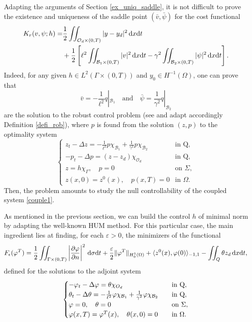 \documentclass{dcds-bOF}
\theoremstyle{definition}
\def\cbd{\Gamma}
\newcommand\csin[1]{\chi_{#1}}
\def\dx{\,\textnormal{d}x}
\def\dt{\textnormal{d}t}
\def\d{\,\textnormal{d}}
\begin{document}
Adapting the arguments of Section \ref{ex_uniq_saddle}, it is not difficult to prove the existence and uniqueness of the saddle point $(\bar v,\bar \psi)$ for the cost functional
%
\begin{equation*}%
\begin{split}
K_r(v,\psi;h)=&\frac{1}{2}\iint_{\mathcal O_d\times(0,T)}|y-y_d|^2\dx\dt\\
&+\frac{1}{2}\left[\ell^2\iint_{\mathcal B_1\times(0,T)}|v|^2\dx\dt-\gamma^2\iint_{\mathcal B_2\times(0,T)}|\psi|^2\dx\dt\right].
\end{split}
\end{equation*}
%
Indeed, for any given $h\in L^2(\cbd\times(0,T))$ and $y_0\in H^{-1}(\Omega)$, one can prove that
%
\begin{equation*}
\bar v=-\frac{1}{\ell^2}q|_{\mathcal B_1} \quad\text{and}\quad \bar \psi=\frac{1}{\gamma^2}q|_{\mathcal B_2}
\end{equation*}
%
are the solution to the robust control problem (see and adapt accordingly Definition \ref{defi_rob}), where $p$ is found from the solution $(z,p)$ to the optimality system
\begin{equation}\label{couple1}
\begin{cases}
z_t-\Delta z=-\frac{1}{\ell^2}p\csin{\mathcal B_1}+\frac{1}{\gamma^2}p\csin{\mathcal B_2} & \text{in Q}, \\
-p_t-\Delta p=(z-z_d)\chi_{\mathcal O_d} & \text{in Q}, \\
z=h\csin{\Gamma}, \quad p=0 &\text{on } \Sigma, \\
z(x,0)=z^0(x), \quad p(x,T)=0& \text{in } \Omega.
\end{cases}
\end{equation}
%
Then, the problem amounts to study the null controllability of the coupled system \eqref{couple1}.

As mentioned in the previous section, we can build the control $h$ of minimal norm by adapting the well-known HUM method. For this particular case, the main ingredient lies at finding, for each $\varepsilon>0$, the minimizers of the functional
%
\begin{equation}\label{func_FR}
F_{\epsilon}(\varphi^T)=\frac{1}{2}\iint_{\cbd\times(0,T)}\left|\frac{\partial \varphi}{\partial n}\right|^2\d\sigma\dt+\frac{\varepsilon}{2}\|\varphi^T\|_{H_0^1(\Omega)}+\langle z^0(x),\varphi(0)\rangle_{-1,1}-\iint_{Q}\theta z_d \dx\dt,
\end{equation}
%
defined for the solutions to the adjoint system
%
\begin{equation}\label{adjunto1}
\begin{cases}
-\varphi_t-\Delta \varphi=\theta\csin{\mathcal \mathcal O_d} &\quad \text{in Q}, \\
\theta_t-\Delta \theta=-\frac{1}{\ell^2}\varphi\csin{\mathcal B_1}+\frac{1}{\gamma^2}\varphi \csin{\mathcal B_2} & \quad \text{in Q}, \\
\varphi=0, \quad \theta=0 &\quad \text{on } \Sigma, \\
\varphi(x,T)=\varphi^T(x), \quad \theta(x,0)=0&\quad \text{in } \Omega.
\end{cases}
\end{equation}
\end{document}
